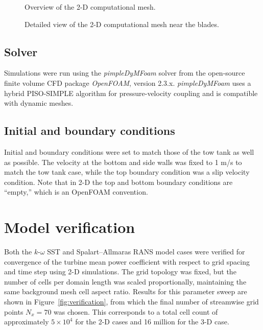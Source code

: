 \begin{figure}[ht]

    \caption{Overview of the 2-D computational mesh.}

    \label{fig:mesh}
\end{figure}


\begin{figure}[ht]

    \caption{Detailed view of the 2-D computational mesh near the blades.}

    \label{fig:blade-mesh}
\end{figure}


\subsection{Solver}

Simulations were run using the \textit{pimpleDyMFoam} solver from the
open-source finite volume CFD package \textit{OpenFOAM}, version 2.3.x.
\textit{pimpleDyMFoam} uses a hybrid PISO-SIMPLE algorithm for pressure-velocity
coupling and is compatible with dynamic meshes.

\subsection{Initial and boundary conditions}

Initial and boundary conditions were set to match those of the tow tank as well
as possible. The velocity at the bottom and side walls was fixed to 1 m/s to
match the tow tank case, while the top boundary condition was a slip velocity
condition. Note that in 2-D the top and bottom boundary conditions are
``empty,'' which is an OpenFOAM convention.


\section{Model verification}

Both the $k$-$\omega$ SST and Spalart--Allmaras RANS model cases were verified
for convergence of the turbine mean power coefficient with respect to grid
spacing and time step using 2-D simulations. The grid topology was fixed, but
the number of cells per domain length was scaled proportionally, maintaining the
same background mesh cell aspect ratio. Results for this parameter sweep are
shown in Figure~\ref{fig:verification}, from which the final number of
streamwise grid points $N_x = 70$ was chosen. This corresponds to a total cell
count of approximately $5 \times 10^4$ for the 2-D cases and 16 million for the
3-D case.

